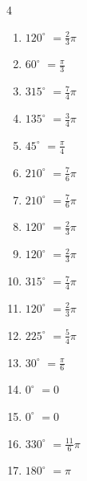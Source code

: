\begin{multicols}{4}
\begin{enumerate}
  \item $\displaystyle 120^{\circ}$
        $\displaystyle =\frac{2}{3}\pi$

  \item $\displaystyle 60^{\circ}$
        $\displaystyle =\frac{\pi}{3}$

  \item $\displaystyle 315^{\circ}$
        $\displaystyle =\frac{7}{4}\pi$

  \item $\displaystyle 135^{\circ}$
        $\displaystyle =\frac{3}{4}\pi$

  \item $\displaystyle 45^{\circ}$
        $\displaystyle =\frac{\pi}{4}$

  \item $\displaystyle 210^{\circ}$
        $\displaystyle =\frac{7}{6}\pi$

  \item $\displaystyle 210^{\circ}$
        $\displaystyle =\frac{7}{6}\pi$

  \item $\displaystyle 120^{\circ}$
        $\displaystyle =\frac{2}{3}\pi$

  \item $\displaystyle 120^{\circ}$
        $\displaystyle =\frac{2}{3}\pi$

  \item $\displaystyle 315^{\circ}$
        $\displaystyle =\frac{7}{4}\pi$

  \item $\displaystyle 120^{\circ}$
        $\displaystyle =\frac{2}{3}\pi$

  \item $\displaystyle 225^{\circ}$
        $\displaystyle =\frac{5}{4}\pi$

  \item $\displaystyle 30^{\circ}$
        $\displaystyle =\frac{\pi}{6}$

  \item $\displaystyle 0^{\circ}$
        $\displaystyle =0$

\columnbreak %

\resetques

  \item $\displaystyle 0^{\circ}$
        $\displaystyle =0$

  \item $\displaystyle 330^{\circ}$
        $\displaystyle =\frac{11}{6}\pi$

  \item $\displaystyle 180^{\circ}$
        $\displaystyle =\pi$


\end{enumerate}
\end{multicols}
